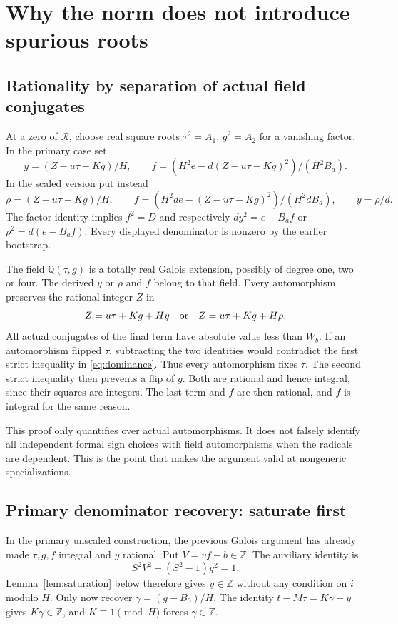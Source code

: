 \documentclass[11pt]{article}
\newcommand{\Z}{\mathbb Z}
\begin{document}
\section{Why the norm does not introduce spurious roots}\label{sec:proof12}

\subsection{Rationality by separation of actual field conjugates}
At a zero of $\mathcal R$, choose real square roots $\tau^2=A_1$, $g^2=A_2$ for a vanishing factor. In the primary case set
\[
 y=(Z-u\tau-Kg)/H,\qquad f=(H^2e-d(Z-u\tau-Kg)^2)/(H^2B_a).
\]
In the scaled version put instead
\[
 \rho=(Z-u\tau-Kg)/H,\qquad
 f=(H^2de-(Z-u\tau-Kg)^2)/(H^2dB_a),\qquad y=\rho/d.
\]
The factor identity implies $f^2=D$ and respectively $dy^2=e-B_af$ or $\rho^2=d(e-B_af)$. Every displayed denominator is nonzero by the earlier bootstrap.

The field $\mathbb Q(\tau,g)$ is a totally real Galois extension, possibly of degree one, two or four. The derived $y$ or $\rho$ and $f$ belong to that field. Every automorphism preserves the rational integer $Z$ in
\[
 Z=u\tau+Kg+H y\quad\hbox{or}\quad Z=u\tau+Kg+H\rho.
\]
All actual conjugates of the final term have absolute value less than $W_b$. If an automorphism flipped $\tau$, subtracting the two identities would contradict the first strict inequality in \eqref{eq:dominance}. Thus every automorphism fixes $\tau$. The second strict inequality then prevents a flip of $g$. Both are rational and hence integral, since their squares are integers. The last term and $f$ are then rational, and $f$ is integral for the same reason.

This proof only quantifies over actual automorphisms. It does not falsely identify all independent formal sign choices with field automorphisms when the radicals are dependent. This is the point that makes the argument valid at nongeneric specializations.

\subsection{Primary denominator recovery: saturate first}
In the primary unscaled construction, the previous Galois argument has already made $\tau,g,f$ integral and $y$ rational. Put $V=vf-b\in\Z$. The auxiliary identity is
\[
 S^2V^2-(S^2-1)y^2=1.
\]
Lemma~\ref{lem:saturation} below therefore gives $y\in\Z$ without any condition on $i$ modulo $H$. Only now recover $\gamma=(g-B_0)/H$. The identity $t-M\tau=K\gamma+y$ gives $K\gamma\in\Z$, and $K\equiv1\pmod H$ forces $\gamma\in\Z$.
\end{document}
